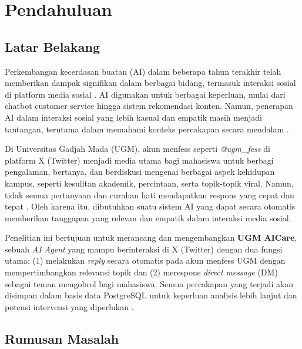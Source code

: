
\chapter{Pendahuluan}

\section{Latar Belakang}

\noindent
	\parbox{\textwidth}{%
		
		\hspace{1cm} Perkembangan kecerdasan buatan (AI) dalam beberapa tahun terakhir telah memberikan dampak signifikan dalam berbagai bidang, termasuk interaksi sosial di platform media sosial \cite{sifaleras2024generative}. AI digunakan untuk berbagai keperluan, mulai dari chatbot customer service hingga sistem rekomendasi konten. Namun, penerapan AI dalam interaksi sosial yang lebih kasual dan empatik masih menjadi tantangan, terutama dalam memahami konteks percakapan secara mendalam \cite{ghosh2025voice}.
		
		\hspace{1cm} Di Universitas Gadjah Mada (UGM), akun menfess seperti \textit{@ugm\_fess} di platform X (Twitter) menjadi media utama bagi mahasiswa untuk berbagi pengalaman, bertanya, dan berdiskusi mengenai berbagai aspek kehidupan kampus, seperti kesulitan akademik, percintaan, serta topik-topik viral. Namun, tidak semua pertanyaan dan curahan hati mendapatkan respons yang cepat dan tepat \cite{alathamneh2024t5}. Oleh karena itu, dibutuhkan suatu sistem AI yang dapat secara otomatis memberikan tanggapan yang relevan dan empatik dalam interaksi media sosial.
		
		\hspace{1cm} Penelitian ini bertujuan untuk merancang dan mengembangkan \textbf{UGM AICare}, sebuah \textit{AI Agent} yang mampu berinteraksi di X (Twitter) dengan dua fungsi utama: (1) melakukan \textit{reply} secara otomatis pada akun menfess UGM dengan mempertimbangkan relevansi topik dan (2) merespons \textit{direct message} (DM) sebagai teman mengobrol bagi mahasiswa. Semua percakapan yang terjadi akan disimpan dalam basis data PostgreSQL untuk keperluan analisis lebih lanjut dan potensi intervensi yang diperlukan \cite{denecke2024ethical}.
		
	}

\section{Rumusan Masalah}

